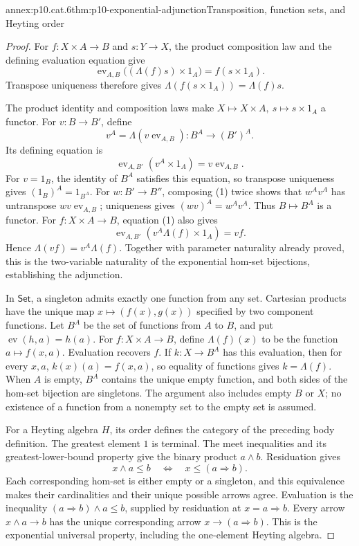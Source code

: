\begin{annexitem}{annex:p10.cat.6}{thm:p10-exponential-adjunction}{Transposition, function sets, and Heyting order}
\begin{proof}
For \(f:X\times A\to B\) and \(s:Y\to X\), the product
composition law and the defining evaluation equation give
\[
 \operatorname{ev}_{A,B}\bigl((\Lambda(f)s)\times1_A\bigr)
       =f(s\times1_A).
\]
Transpose uniqueness therefore gives
\(\Lambda(f(s\times1_A))=\Lambda(f)s\).

The product identity and composition laws make
\(X\mapsto X\times A,\ s\mapsto s\times1_A\) a functor.
For \(v:B\to B'\), define
\[
 v^A=\Lambda(v\operatorname{ev}_{A,B}):B^A\to(B')^A.
\]
Its defining equation is
\[
                 \operatorname{ev}_{A,B'}(v^A\times1_A)
                        =v\operatorname{ev}_{A,B}.          \tag{1}
\]
For \(v=1_B\), the identity of \(B^A\) satisfies this equation,
so transpose uniqueness gives \((1_B)^A=1_{B^A}\).
For \(w:B'\to B''\), composing (1) twice shows that
\(w^A v^A\) has untranspose \(wv\operatorname{ev}_{A,B}\);
uniqueness gives \((wv)^A=w^A v^A\).
Thus \(B\mapsto B^A\) is a functor.
For \(f:X\times A\to B\), equation (1) also gives
\[
                  \operatorname{ev}_{A,B'}(v^A\Lambda(f)\times1_A)
                        =v f.
\]
Hence \(\Lambda(v f)=v^A\Lambda(f)\).
Together with parameter naturality already proved, this is
the two-variable naturality of the exponential hom-set
bijections, establishing the adjunction.

In \(\mathsf{Set}\), a singleton admits exactly one function
from any set.  Cartesian products have the unique map
\(x\mapsto(f(x),g(x))\) specified by two component functions.
Let \(B^A\) be the set of functions from \(A\) to \(B\), and
put \(\operatorname{ev}(h,a)=h(a)\).
For \(f:X\times A\to B\), define
\(\Lambda(f)(x)\) to be the function \(a\mapsto f(x,a)\).
Evaluation recovers \(f\).
If \(k:X\to B^A\) has this evaluation, then for every \(x,a\),
\(k(x)(a)=f(x,a)\), so equality of functions gives
\(k=\Lambda(f)\).
When \(A\) is empty, \(B^A\) contains the unique empty function,
and both sides of the hom-set bijection are singletons.
The argument also includes empty \(B\) or \(X\); no existence
of a function from a nonempty set to the empty set is assumed.

For a Heyting algebra \(H\), its order defines the category
of the preceding body definition.
The greatest element \(1\) is terminal.
The meet inequalities and its greatest-lower-bound property
give the binary product \(a\wedge b\).
Residuation gives
\[
                        x\wedge a\leq b
                        \quad\Longleftrightarrow\quad
                        x\leq(a\Rightarrow b).
\]
Each corresponding hom-set is either empty or a singleton,
and this equivalence makes their cardinalities and their
unique possible arrows agree.
Evaluation is the inequality
\((a\Rightarrow b)\wedge a\leq b\), supplied by residuation
at \(x=a\Rightarrow b\).  Every arrow \(x\wedge a\to b\)
has the unique corresponding arrow \(x\to(a\Rightarrow b)\).
This is the exponential universal property, including
the one-element Heyting algebra.
\end{proof}
\end{annexitem}
